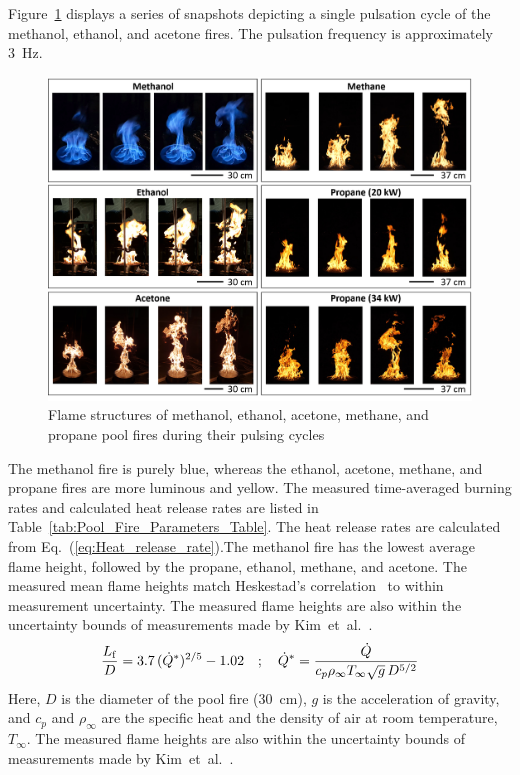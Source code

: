 \documentclass[12pt]{article}
\begin{document}
Figure~\ref{fig:Flame_Structure} displays a series of snapshots depicting a single pulsation cycle of the methanol, ethanol, and acetone fires. The pulsation frequency is approximately 3~Hz.
\begin{figure}
	\centering
\includegraphics[width=\textwidth,keepaspectratio]{Flame_Structure.png}
	\caption[Photographs of the three fires]{Flame structures of methanol, ethanol, acetone, methane, and propane pool fires during their pulsing cycles}
	\label{fig:Flame_Structure}
\end{figure}
The methanol fire is purely blue, whereas the ethanol, acetone, methane, and propane fires are more luminous and yellow. The measured time-averaged burning rates and calculated heat release rates are listed in Table~\ref{tab:Pool_Fire_Parameters_Table}. The heat release rates are calculated from Eq.~(\ref{eq:Heat_release_rate}).The methanol fire has the lowest average flame height, followed by the propane, ethanol, methane, and acetone. The measured mean flame heights match Heskestad’s correlation~\cite{Heskestad1983} to within measurement uncertainty. The measured flame heights are also within the uncertainty bounds of measurements made by Kim~et~al.~\cite{Kim2019}. 
\begin{equation}
\frac{L_{\rm f}}{D} = 3.7 \, (\dot{Q}^*)^{2/5} - 1.02 \quad ; \quad \dot{Q}^*=\frac{\dot{Q}}{c_{p}\rho_\infty T_\infty \sqrt{g} \, D^{5/2}}
\end{equation}
Here, $D$ is the diameter of the pool fire (30~cm), $g$ is the acceleration of gravity, and $c_p$ and $\rho_\infty$ are the specific heat and the density of air at room temperature, $T_\infty$. The measured flame heights are also within the uncertainty bounds of measurements made by Kim~et~al.~\cite{Kim2019}.
\end{document}
